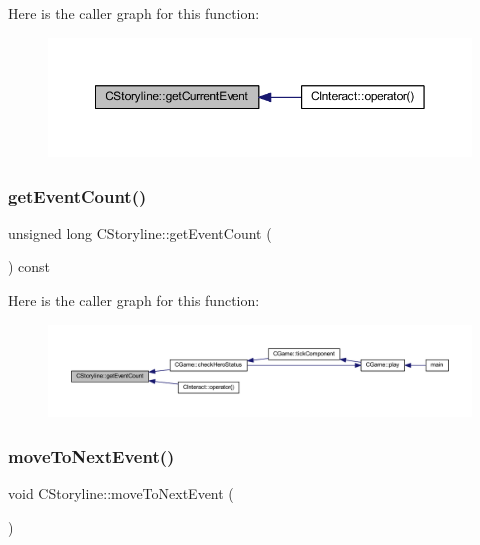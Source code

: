 Here is the caller graph for this function\+:\nopagebreak
\begin{figure}[H]
\begin{center}
\leavevmode
\includegraphics[width=350pt]{class_c_storyline_a5de98e457a382194c6bcdcd57dda33c4_icgraph}
\end{center}
\end{figure}
\mbox{\label{class_c_storyline_a9531c0509722bbb1647837d4549a9520}} 
\subsubsection{\texorpdfstring{get\+Event\+Count()}{getEventCount()}}
{\footnotesize\ttfamily unsigned long C\+Storyline\+::get\+Event\+Count (\begin{DoxyParamCaption}{ }\end{DoxyParamCaption}) const\hspace{0.3cm}{\ttfamily [inline]}}

Here is the caller graph for this function\+:\nopagebreak
\begin{figure}[H]
\begin{center}
\leavevmode
\includegraphics[width=350pt]{class_c_storyline_a9531c0509722bbb1647837d4549a9520_icgraph}
\end{center}
\end{figure}
\mbox{\label{class_c_storyline_aea8684dfbe5f41a4443616eb8f7b7560}} 
\subsubsection{\texorpdfstring{move\+To\+Next\+Event()}{moveToNextEvent()}}
{\footnotesize\ttfamily void C\+Storyline\+::move\+To\+Next\+Event (\begin{DoxyParamCaption}{ }\end{DoxyParamCaption})\hspace{0.3cm}{\ttfamily [inline]}}


